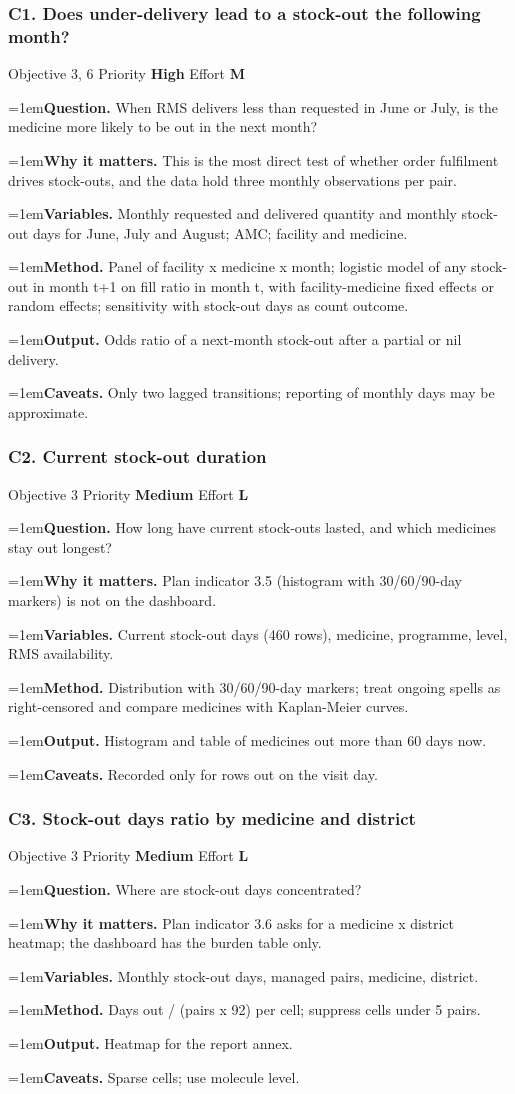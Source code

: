 \documentclass[10pt,a4paper]{article}
\newcommand{\field}[2]{\par\hangindent=1em\textbf{#1.} #2}
\begin{document}
\subsubsection*{C1. Does under-delivery lead to a stock-out the following month?}
{\footnotesize\color{gray} Objective 3, 6 \textperiodcentered{} Priority \textbf{High} \textperiodcentered{} Effort \textbf{M}}
\field{Question}{When RMS delivers less than requested in June or July, is the medicine more likely to be out in the next month?}
\field{Why it matters}{This is the most direct test of whether order fulfilment drives stock-outs, and the data hold three monthly observations per pair.}
\field{Variables}{Monthly requested and delivered quantity and monthly stock-out days for June, July and August; AMC; facility and medicine.}
\field{Method}{Panel of facility x medicine x month; logistic model of any stock-out in month t+1 on fill ratio in month t, with facility-medicine fixed effects or random effects; sensitivity with stock-out days as count outcome.}
\field{Output}{Odds ratio of a next-month stock-out after a partial or nil delivery.}
\field{Caveats}{Only two lagged transitions; reporting of monthly days may be approximate.}
\subsubsection*{C2. Current stock-out duration}
{\footnotesize\color{gray} Objective 3 \textperiodcentered{} Priority \textbf{Medium} \textperiodcentered{} Effort \textbf{L}}
\field{Question}{How long have current stock-outs lasted, and which medicines stay out longest?}
\field{Why it matters}{Plan indicator 3.5 (histogram with 30/60/90-day markers) is not on the dashboard.}
\field{Variables}{Current stock-out days (460 rows), medicine, programme, level, RMS availability.}
\field{Method}{Distribution with 30/60/90-day markers; treat ongoing spells as right-censored and compare medicines with Kaplan-Meier curves.}
\field{Output}{Histogram and table of medicines out more than 60 days now.}
\field{Caveats}{Recorded only for rows out on the visit day.}
\subsubsection*{C3. Stock-out days ratio by medicine and district}
{\footnotesize\color{gray} Objective 3 \textperiodcentered{} Priority \textbf{Medium} \textperiodcentered{} Effort \textbf{L}}
\field{Question}{Where are stock-out days concentrated?}
\field{Why it matters}{Plan indicator 3.6 asks for a medicine x district heatmap; the dashboard has the burden table only.}
\field{Variables}{Monthly stock-out days, managed pairs, medicine, district.}
\field{Method}{Days out / (pairs x 92) per cell; suppress cells under 5 pairs.}
\field{Output}{Heatmap for the report annex.}
\field{Caveats}{Sparse cells; use molecule level.}
\end{document}
